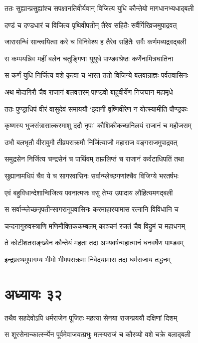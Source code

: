\twolineshloka
{ततः सुह्यान्प्रसुह्यांश्च सपक्षानतिवीर्यवान्}
{विजित्य युधि कौन्तेयो मागधानभ्यधाद्बली}


\twolineshloka
{दण्डं च दण्डधारं च विजित्य पृथिवीपतीन्}
{तैरेव सहितैः सर्वैर्गिरिव्रजमुपाद्रवत्}


\twolineshloka
{जारासन्धिं सान्त्वयित्वा करे च विनिवेश्य ह}
{तैरेव सहितैः सर्वैः कर्णमब्यद्रवद्बली}


\twolineshloka
{स कम्पयन्निव महीं बलेन चतुङ्गिणा}
{युयुधे पाण्डवश्रेष्ठः कर्णेनामित्रघातिना}


\twolineshloka
{स कर्णं युधि निर्जित्य वशे कृत्वा च भारत}
{ततो विजिग्ये बलवान्राज्ञः पर्वतवासिनः}


\twolineshloka
{अथ मोदागिरौ चैव राजानं बलवत्तरम्}
{पाण्डवो बाहुवीर्येण निजघान महामृधे}


\twolineshloka
{ततः पुण्ड्राधिपं वीरं वासुदेवं समाययौ}
{`इदानीं वृष्णिवीरेण न योत्स्यामीति पौण्ड्रकः}


\twolineshloka
{कृष्णस्य भुजसंत्रासात्करमाशु ददौ नृपः'}
{कौशिकीकच्छनिलयं राजानं च महौजसम्}


\twolineshloka
{उभौ बलभृतौ वीरावुमौ तीव्रपराक्रमौ}
{निर्जित्याजौ महाराज वङ्गराजमुपाद्रवत्}


\twolineshloka
{समुद्रसेन निर्जित्य चन्द्रसेनं च पार्थिवम्}
{ताम्रलिप्तं च राजानं कर्वटाधिपतिं तथा}


\twolineshloka
{सुह्यानामधिपं चैव ये च सागरवासिनः}
{सर्वान्म्लेच्छगणांश्चैव विजिग्ये भरतर्षभः}


\twolineshloka
{एवं बहुविधान्देशान्विजित्य पवनात्मजः}
{वसु तेभ्य उपादाय लौहित्यमगद्बली}


\twolineshloka
{स सर्वान्म्लेच्छनृपतीन्सागरानूपवासिनः}
{करमाहारयामास रत्नानि विविधानि च}


\twolineshloka
{चन्दनागुरुवस्त्राणि मणिमौक्तिककम्बलम्}
{काञ्चनं रजतं चैव विद्रुमं च महाधनम्}


\twolineshloka
{ते कोटीशतसङ्ख्येन कौन्तेयं महता तदा}
{अभ्यवर्षन्महात्मानं धनवर्षेण पाण्डवम्}


\twolineshloka
{इन्द्रप्रस्थमुपागम्य भीमो भीमपराक्रमः}
{निवेदयामास तदा धर्मराजाय तद्धनम्}


\chapter{अध्यायः ३२}
\twolineshloka
{तथैव सहदेवोऽपि धर्मराजेन पूजितः}
{महत्या सेनया राजन्प्रययौ दक्षिणां दिशम्}


\twolineshloka
{स शूरसेनान्कार्त्स्न्येन पूर्वमेवाजयत्प्रभुः}
{मत्स्यराजं च कौरव्यो वशे चक्रे बलाद्बली}


